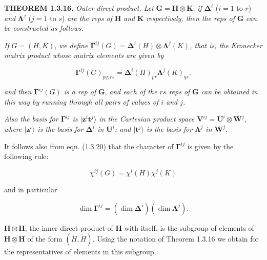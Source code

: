 \documentclass[11pt,a4paper,twoside,openright]{book}
\begin{document}
\textbf{THEOREM 1.3.16.} \textit{Outer direct product. Let} $\mathbf{G} = \mathbf{H} \otimes \mathbf{K}$; \textit{if} $\boldsymbol{\Delta}^{i}$ ($i = 1$ to $r$) \textit{and} $\boldsymbol{\Lambda}^{j}$ ($j = 1$ to $s$) \textit{are the reps of} $\mathbf{H}$ \textit{and} $\mathbf{K}$ \textit{respectively, then the reps of} $\mathbf{G}$ \textit{can be constructed as follows.}

\textit{If} $G = (H, K)$, \textit{we define $\boldsymbol{\Gamma}^{ij}(G) = \boldsymbol{\Delta}^{i}(H) \otimes \boldsymbol{\Lambda}^{j}(K)$, that is, the Kronecker matrix product whose matrix elements are given by}

\begin{equation*}
\boldsymbol{\Gamma}^{ij}(G)_{pq;rs} = \boldsymbol{\Delta}^{i}(H)_{pr}\boldsymbol{\Lambda}^{j}(K)_{qs}. \tag{1.3.20}
\end{equation*}

\textit{and then $\boldsymbol{\Gamma}^{ij}(G)$ is a rep of} $\mathbf{G}$, \textit{and each of the $rs$ reps of} $\mathbf{G}$ \textit{can be obtained in this way by running through all pairs of values of $i$ and $j$.}

\textit{Also the basis for $\boldsymbol{\Gamma}^{ij}$ is $|\mathbf{z}^{i}\mathbf{t}^{j}\rangle$ in the Cartesian product space $\mathbf{V}^{ij} = \mathbf{U}^{i} \otimes \mathbf{W}^{j}$, where $|\mathbf{z}^{i}\rangle$ is the basis for $\boldsymbol{\Delta}^{i}$ in $\mathbf{U}^{i}$; and $|\mathbf{t}^{j}\rangle$ is the basis for $\boldsymbol{\Lambda}^{j}$ in $\mathbf{W}^{j}$.}

It follows also from eqn. (1.3.20) that the character of $\boldsymbol{\Gamma}^{ij}$ is given by the following rule:

\begin{equation*}
\chi^{ij}(G) = \chi^{i}(H)\chi^{j}(K) \tag{1.3.21}
\end{equation*}

and in particular

\begin{equation*}
\dim \boldsymbol{\Gamma}^{ij} = (\dim \boldsymbol{\Delta}^{i})(\dim \boldsymbol{\Lambda}^{j}). \tag{1.3.22}
\end{equation*}

$\mathbf{H} \boxtimes \mathbf{H}$, the inner direct product of $\mathbf{H}$ with itself, is the subgroup of elements of $\mathbf{H} \otimes \mathbf{H}$ of the form $(H, \dot{H})$. Using the notation of Theorem 1.3.16 we obtain for the representatives of elements in this subgroup,
\end{document}
